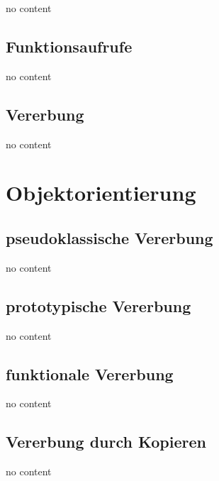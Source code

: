 \begin{frame}
  no content
\end{frame}

\subsection{Funktionsaufrufe}

\begin{frame}
  no content
\end{frame}

\subsection{Vererbung}

\begin{frame}
  no content
\end{frame}

\section{Objektorientierung}

\subsection{pseudoklassische Vererbung}

\begin{frame}
  no content
\end{frame}

\subsection{prototypische Vererbung}

\begin{frame}
  no content
\end{frame}

\subsection{funktionale Vererbung}

\begin{frame}
  no content
\end{frame}

\subsection{Vererbung durch Kopieren}

\begin{frame}
  no content
\end{frame}

